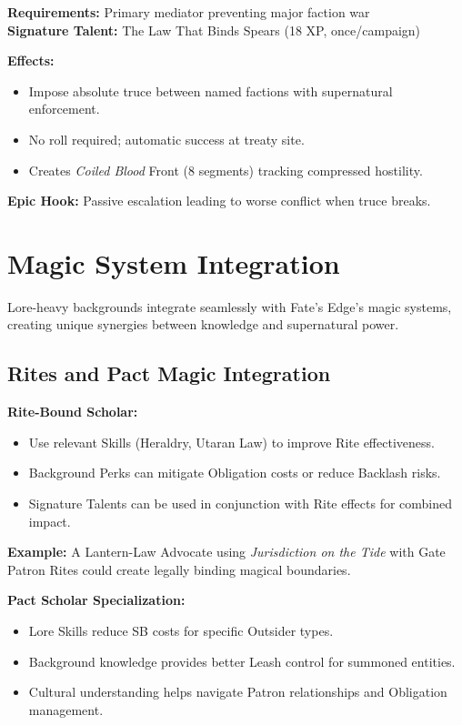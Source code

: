 \textbf{Requirements:} Primary mediator preventing major faction war\\
\textbf{Signature Talent:} The Law That Binds Spears (18 XP, once/campaign)

\textbf{Effects:}
\begin{itemize}
\item Impose absolute truce between named factions with supernatural enforcement.
\item No roll required; automatic success at treaty site.
\item Creates \emph{Coiled Blood} Front (8 segments) tracking compressed hostility.
\end{itemize}

\textbf{Epic Hook:} Passive escalation leading to worse conflict when truce breaks.

\section{Magic System Integration}
\label{sec:magic-integration}

Lore-heavy backgrounds integrate seamlessly with Fate's Edge's magic systems, creating unique synergies between knowledge and supernatural power.

\subsection{Rites and Pact Magic Integration}
\label{subsec:rites-integration}

\textbf{Rite-Bound Scholar:}
\begin{itemize}
\item Use relevant Skills (Heraldry, Utaran Law) to improve Rite effectiveness.
\item Background Perks can mitigate Obligation costs or reduce Backlash risks.
\item Signature Talents can be used in conjunction with Rite effects for combined impact.
\end{itemize}

\textbf{Example:} A Lantern-Law Advocate using \emph{Jurisdiction on the Tide} with Gate Patron Rites could create legally binding magical boundaries.

\textbf{Pact Scholar Specialization:}
\begin{itemize}
\item Lore Skills reduce SB costs for specific Outsider types.
\item Background knowledge provides better Leash control for summoned entities.
\item Cultural understanding helps navigate Patron relationships and Obligation management.
\end{itemize}

